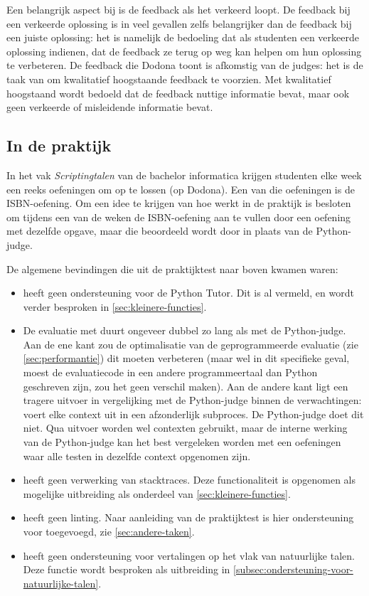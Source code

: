 Een belangrijk aspect bij  is de feedback als het verkeerd loopt.
De feedback bij een verkeerde oplossing is in veel gevallen zelfs belangrijker dan de feedback bij een juiste oplossing: het is namelijk de bedoeling dat als studenten een verkeerde oplossing indienen, dat de feedback ze terug op weg kan helpen om hun oplossing te verbeteren.
De feedback die Dodona toont is afkomstig van de judges: het is de taak van \tested{} om kwalitatief hoogstaande feedback te voorzien.
Met kwalitatief hoogstaand wordt bedoeld dat de feedback nuttige informatie bevat, maar ook geen verkeerde of misleidende informatie bevat.

\subsection{In de praktijk}\label{subsec:in-de-praktijk}

In het vak \emph{Scriptingtalen} van de bachelor informatica krijgen studenten elke week een reeks oefeningen om op te lossen (op Dodona).
Een van die oefeningen is de ISBN-oefening.
Om een idee te krijgen van hoe \tested{} werkt in de praktijk is besloten om tijdens een van de weken de ISBN-oefening aan te vullen door een oefening met dezelfde opgave, maar die beoordeeld wordt door \tested{} in plaats van de Python-judge.

De algemene bevindingen die uit de praktijktest naar boven kwamen waren:

\begin{itemize}
    \item \tested{} heeft geen ondersteuning voor de Python Tutor.
    Dit is al vermeld, en wordt verder besproken in \cref{sec:kleinere-functies}.
    \item De evaluatie met \tested{} duurt ongeveer dubbel zo lang als met de Python-judge.
    Aan de ene kant zou de optimalisatie van de geprogrammeerde evaluatie (zie \cref{sec:performantie}) dit moeten verbeteren (maar wel in dit specifieke geval, moest de evaluatiecode in een andere programmeertaal dan Python geschreven zijn, zou het geen verschil maken).
    Aan de andere kant ligt een tragere uitvoer in vergelijking met de Python-judge binnen de verwachtingen: \tested{} voert elke context uit in een afzonderlijk subproces.
    De Python-judge doet dit niet.
    Qua uitvoer worden wel contexten gebruikt, maar de interne werking van de Python-judge kan het best vergeleken worden met een oefeningen waar alle testen in dezelfde context opgenomen zijn.
    \item \tested{} heeft geen verwerking van stacktraces.
    Deze functionaliteit is opgenomen als mogelijke uitbreiding als onderdeel van \cref{sec:kleinere-functies}.
    \item \tested{} heeft geen linting.
    Naar aanleiding van de praktijktest is hier ondersteuning voor toegevoegd, zie \cref{sec:andere-taken}.
    \item \tested{} heeft geen ondersteuning voor vertalingen op het vlak van natuurlijke talen.
    Deze functie wordt besproken als uitbreiding in \cref{subsec:ondersteuning-voor-natuurlijke-talen}.
\end{itemize}

